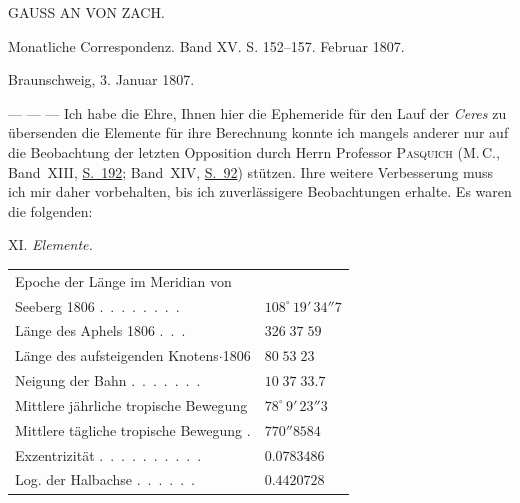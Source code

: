 \begin{center}
GAUSS AN VON ZACH.
\end{center}

\begin{center}
Monatliche Correspondenz. Band XV. S. 152–157. Februar 1807.
\end{center}

\begin{flushright}
Braunschweig, 3. Januar 1807.
\end{flushright}

\par\indent --- --- --- Ich habe die Ehre, Ihnen hier die Ephemeride für den Lauf der \emph{Ceres} zu übersenden
die Elemente für ihre Berechnung konnte ich mangels anderer nur auf die Beobachtung der letzten Opposition durch Herrn Professor
%
\textsc{Pasquich} (M.\,C., Band~XIII, \href{https://www.digitale-sammlungen.de/en/view/bsb10538605?page=200}{S.~192}; Band~XIV, \href{https://www.digitale-sammlungen.de/en/view/bsb10538606?page=102}{S.~92}) stützen. Ihre weitere Verbesserung muss ich mir daher vorbehalten, bis ich zuverlässigere Beobachtungen erhalte.
Es waren die folgenden:

\begin{center}
XI. \emph{Elemente.}
\end{center}

\begin{center}\begingroup
\fontsize{9}{11}\selectfont
\setlength{\tabcolsep}{3pt}\renewcommand{\arraystretch}{1.12}
\begin{tabular}{ll}
\multicolumn{2}{l}{Epoche der Länge im Meridian von} \\
\quad Seeberg 1806 .\ .\ .\ .\ .\ .\ .\ . & $108^\circ\,19'\,34''7$ \\
Länge des Aphels 1806 .\ .\ . & $326\;37\;59$ \\
Länge des aufsteigenden Knotens$\cdot$1806  & $80\;53\;23$ \\
Neigung der Bahn .\ .\ .\ .\ .\ .\ . & $10\;37\;33.7$ \\
Mittlere jährliche tropische Bewegung  & $78^\circ\,9'\,23''3$ \\
Mittlere tägliche tropische Bewegung . & $770''8584$ \\
Exzentrizität .\ .\ .\ .\ .\ .\ .\ .\ .\ . & $0.0783486$ \\
Log. der Halbachse .\ .\ .\ .\ .\ . & $0.4420728$ \\
\end{tabular}\endgroup\end{center}

